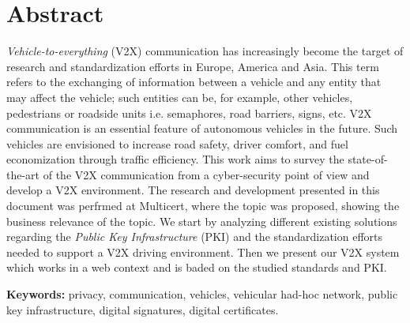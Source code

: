 
\section*{Abstract}


\textit{Vehicle-to-everything} (V2X) communication has increasingly become the target of research and standardization efforts in Europe, America and Asia. This term refers to the exchanging of information between a vehicle and any entity that may affect the vehicle; such entities can be, for example, other vehicles, pedestrians or roadside units  i.e. semaphores, road barriers, signs, etc. V2X communication is an essential feature of autonomous vehicles in the future. Such vehicles are envisioned to increase road safety, driver comfort, and fuel economization through traffic efficiency. This work aims to survey the state-of-the-art of the V2X communication from a cyber-security point of view and develop a V2X environment. The research and development presented in this document was perfrmed at Multicert, where the topic was proposed, showing the business relevance of the topic. We start by analyzing different existing solutions regarding the \textit{Public Key Infrastructure} (PKI) and the standardization efforts needed to support a V2X driving environment. Then we present our V2X system which works in a web context and is baded on the studied standards and PKI.

\vfill

\textbf{\Large Keywords:} privacy, communication, vehicles, vehicular had-hoc network,  public key infrastructure,  digital signatures, digital certificates.


